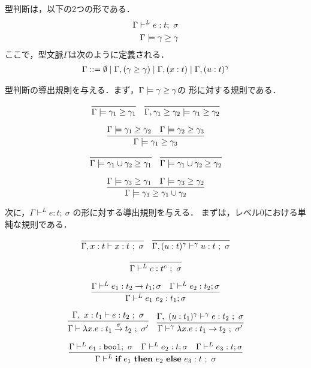 型判断は，以下の2つの形である．
\begin{align*}
  \Gamma \vdash^{L} e : t ;~\sigma \\
  \Gamma \models \gamma \ge \gamma
\end{align*}
ここで，型文脈$\Gamma$は次のように定義される．
\begin{align*}
  \Gamma ::= \emptyset
  \mid \Gamma, (\gamma \ge \gamma)
  \mid \Gamma, (x : t)
  \mid \Gamma, (u : t)^{\gamma}
\end{align*}

型判断の導出規則を与える．まず，$\Gamma \models \gamma \ge \gamma$の
形に対する規則である．

\[
  \infer
  {\Gamma \models \gamma_1 \ord \gamma_1}
  {}
  \quad
  \infer
  {\Gamma, \gamma_1 \ord \gamma_2 \models \gamma_1 \ord \gamma_2}
  {}
\]

\[
  \infer
  {\Gamma \models \gamma_1 \ord \gamma_3}
  {\Gamma \models \gamma_1 \ord \gamma_2 & \Gamma \models \gamma_2 \ord \gamma_3}
\]

\[
  \infer
  {\Gamma \models \gamma_1 \cup \gamma_2 \ord \gamma_1}
  {}
  \quad
  \infer
  {\Gamma \models \gamma_1 \cup \gamma_2 \ord \gamma_2}
  {}
\]

\[
  \infer
  {\Gamma \models \gamma_3 \ord \gamma_1 \cup \gamma_2}
  {\Gamma \models \gamma_3 \ord \gamma_1
    &\Gamma \models \gamma_3 \ord \gamma_2}
\]



次に，$\Gamma \vdash^{L} e : t ;~\sigma$ の形に対する導出規則を与える．
まずは，レベル0における単純な規則である．

\[
  \infer
  {\Gamma, x : t \vdash x : t ~;~ \sigma}
  {}
  \quad
  \infer
  {\Gamma, (u : t)^\gamma \vdash^\gamma u : t ~;~ \sigma}
  {}
\]

\[
  \infer
  {\Gamma \vdash^{L} c : t^c ~;~\sigma}
  {}
\]

\[
  \infer
  {\Gamma \vdash^{L} e_1~ e_2 : t_1 ; \sigma}
  {\Gamma \vdash^{L} e_1 : t_2 \to t_1 ; \sigma
    & \Gamma \vdash^{L} e_2 : t_2  ; \sigma
  }
\]

\[
  \infer
  {\Gamma \vdash \fun{x}{e} : \funT{t_1}{t_2}{\sigma} ~;~\sigma'}
  {\Gamma,~x : t_1 \vdash e : t_2 ~;~ \sigma}
  \quad
  \infer
  {\Gamma \vdash^\gamma \fun{x}{e} : \funT{t_1}{t_2}{} ~;~\sigma'}
  {\Gamma,~(u : t_1)^\gamma \vdash^\gamma e : t_2 ~;~ \sigma}
\]

\[
  \infer
  {\Gamma \vdash^{L} \ift{e_1}{e_2}{e_3} : t ~;~ \sigma}
  {\Gamma \vdash^{L} e_1 : \boolT ;~ \sigma
    & \Gamma \vdash^{L} e_2 : t ; \sigma
    & \Gamma \vdash^{L} e_3 : t ; \sigma}
\]

